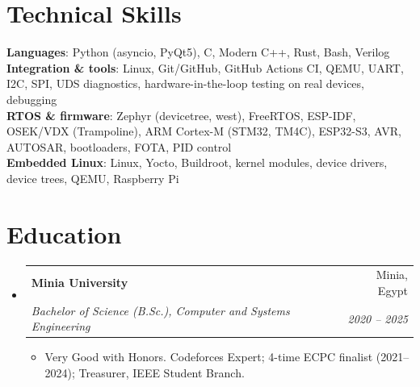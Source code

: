 \documentclass[letterpaper,11pt]{article}
\makeatletter
\newcommand{\resumeItem}[1]{
  \item\small{
    {#1 \vspace{-2pt}}
  }
}
\newcommand{\resumeSubheading}[4]{
  \vspace{-2pt}\item
    \begin{tabular*}{0.97\textwidth}[t]{l@{\extracolsep{\fill}}r}
      \textbf{#1} & #2 \\
      \textit{\small#3} & \textit{\small #4} \\
    \end{tabular*}\vspace{-7pt}
}
\newcommand{\resumeSubHeadingListStart}{\begin{itemize}[leftmargin=0.15in, label={}]}
\newcommand{\resumeSubHeadingListEnd}{\end{itemize}}
\newcommand{\resumeItemListStart}{\begin{itemize}}
\newcommand{\resumeItemListEnd}{\end{itemize}\vspace{-5pt}}
\makeatother
\begin{document}
%
\section{Technical Skills}
 \begin{itemize}[leftmargin=0.15in, label={}]
    \small{\item{
     \textbf{Languages}{: Python (asyncio, PyQt5), C, Modern C++, Rust, Bash, Verilog} \\
     \textbf{Integration \& tools}{: Linux, Git/GitHub, GitHub Actions CI, QEMU, UART, I2C, SPI, UDS diagnostics, hardware-in-the-loop testing on real devices, debugging} \\
     \textbf{RTOS \& firmware}{: Zephyr (devicetree, west), FreeRTOS, ESP-IDF, OSEK/VDX (Trampoline), ARM Cortex-M (STM32, TM4C), ESP32-S3, AVR, AUTOSAR, bootloaders, FOTA, PID control} \\
     \textbf{Embedded Linux}{: Linux, Yocto, Buildroot, kernel modules, device drivers, device trees, QEMU, Raspberry Pi}
    }}
 \end{itemize}

\section{Education}
  \resumeSubHeadingListStart
    \resumeSubheading
      {Minia University}{Minia, Egypt}
      {Bachelor of Science (B.Sc.), Computer and Systems Engineering}{2020 -- 2025}
      \resumeItemListStart
        \resumeItem{Very Good with Honors. Codeforces Expert; 4-time ECPC finalist (2021--2024); Treasurer, IEEE Student Branch.}
      \resumeItemListEnd
  \resumeSubHeadingListEnd


\end{document}
